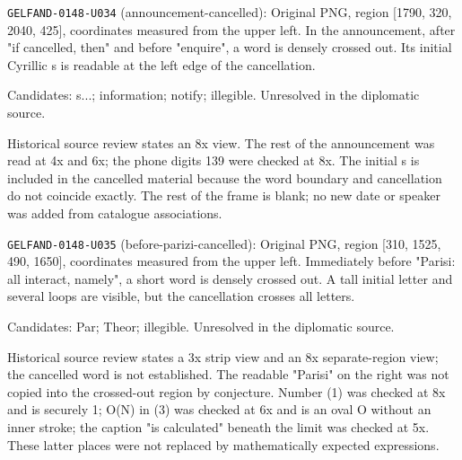 \noindent\texttt{GELFAND-0148-U034} (announcement-cancelled): Original PNG, region [1790, 320, 2040, 425], coordinates measured from the upper left. In the announcement, after "if cancelled, then" and before "enquire", a word is densely crossed out. Its initial Cyrillic s is readable at the left edge of the cancellation.\par
Candidates: s...; information; notify; illegible. Unresolved in the diplomatic source.\par
Historical source review states an 8x view. The rest of the announcement was read at 4x and 6x; the phone digits 139 were checked at 8x. The initial s is included in the cancelled material because the word boundary and cancellation do not coincide exactly. The rest of the frame is blank; no new date or speaker was added from catalogue associations.\par

\noindent\texttt{GELFAND-0148-U035} (before-parizi-cancelled): Original PNG, region [310, 1525, 490, 1650], coordinates measured from the upper left. Immediately before "Parisi: all interact, namely", a short word is densely crossed out. A tall initial letter and several loops are visible, but the cancellation crosses all letters.\par
Candidates: Par; Theor; illegible. Unresolved in the diplomatic source.\par
Historical source review states a 3x strip view and an 8x separate-region view; the cancelled word is not established. The readable "Parisi" on the right was not copied into the crossed-out region by conjecture. Number (1) was checked at 8x and is securely 1; O(N) in (3) was checked at 6x and is an oval O without an inner stroke; the caption "is calculated" beneath the limit was checked at 5x. These latter places were not replaced by mathematically expected expressions.\par
